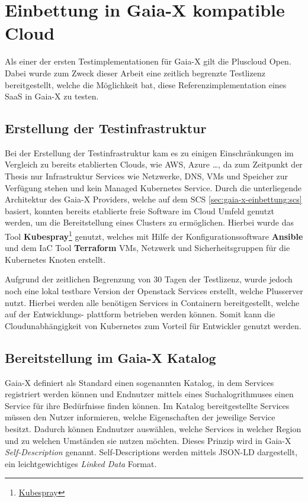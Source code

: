 \chapter{Einbettung in Gaia-X kompatible Cloud}
\label{chapter:gaia-x-einbettung}
Als einer der ersten Testimplementationen für Gaia-X gilt die Pluscloud Open.
Dabei wurde zum Zweck dieser Arbeit eine zeitlich begrenzte Testlizenz bereitgestellt, 
welche die Möglichkeit bat, diese Referenzimplementation eines \ac{SaaS} in Gaia-X zu testen.


\section{Erstellung der Testinfrastruktur}
\label{sec:gaia-x-einbettung:erstellung-testinfra}
Bei der Erstellung der Testinfrastruktur kam es zu einigen Einschränkungen im Vergleich zu bereits etablierten Clouds, 
wie \ac{AWS}, Azure \dots, da zum Zeitpunkt der Thesis nur Infrastruktur Services wie Netzwerke, DNS, \acp{VM} und Speicher 
zur Verfügung stehen und kein Managed Kubernetes Service.
Durch die unterliegende Architektur des Gaia-X Providers, welche auf dem \ac{SCS} \ref{sec:gaia-x-einbettung:scs} basiert,
konnten bereits etablierte freie Software im Cloud Umfeld genutzt werden, um die Bereitstellung eines Clusters zu ermöglichen.
Hierbei wurde das Tool \textbf{Kubespray}\footnote{\href{https://github.com/kubernetes-sigs/kubespray}{Kubespray}} genutzt,
welches mit Hilfe der Konfigurationssoftware \textbf{Ansible} und dem \ac{IaC} Tool \textbf{Terraform} 
\acp{VM}, Netzwerk und Sicherheitsgruppen für die Kubernetes Knoten erstellt. 

Aufgrund der zeitlichen Begrenzung von 30 Tagen der Testlizenz, wurde jedoch noch eine lokal 
testbare Version der Openstack Services erstellt, welche Plusserver nutzt.
Hierbei werden alle benötigen Services in Containern bereitgestellt, welche auf der Entwicklungs-
plattform betrieben werden können. 
Somit kann die Cloudunabhängigkeit von Kubernetes zum Vorteil für Entwickler genutzt werden.


\section{Bereitstellung im Gaia-X Katalog}
\label{sec:gaia-x-einbettung:gaia-x-katalog}
Gaia-X definiert als Standard einen sogenannten Katalog, in dem Services registriert werden können und Endnutzer
mittels eines Suchalogrithmuses einen Service für ihre Bedürfnisse finden können. 
Im Katalog bereitgestellte Services müssen den Nutzer informieren, welche Eigenschaften der jeweilige Service besitzt.
Dadurch können Endnutzer auswählen, welche Services in welcher Region und zu welchen Umständen sie nutzen möchten.
Dieses Prinzip wird in Gaia-X \emph{Self-Description} genannt. Self-Descriptions werden mittels JSON-LD dargestellt, ein
leichtgewichtiges \emph{Linked Data} Format.\cite{Eggers2020}

